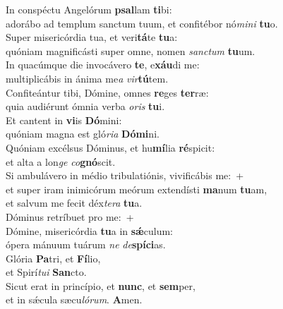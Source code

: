 \evenverse In conspéctu Angelórum \textbf{psal}lam \textbf{ti}bi:~\*\\
\evenverse adorábo ad templum sanctum tuum, et confitébor nó\textit{mi}\textit{ni} \textbf{tu}o.\\
\oddverse Super misericórdia tua, et veri\textbf{tá}te \textbf{tu}a:~\*\\
\oddverse quóniam magnificásti super omne, nomen \textit{san}\textit{ctum} \textbf{tu}um.\\
\evenverse In quacúmque die invocávero \textbf{te}, e\textbf{xáu}di me:~\*\\
\evenverse multiplicábis in ánima me\textit{a} \textit{vir}\textbf{tú}tem.\\
\oddverse Confiteántur tibi, Dómine, omnes \textbf{re}ges \textbf{ter}ræ:~\*\\
\oddverse quia audiérunt ómnia verba \textit{o}\textit{ris} \textbf{tu}i.\\
\evenverse Et cantent in \textbf{vi}is \textbf{Dó}mini:~\*\\
\evenverse quóniam magna est gló\textit{ri}\textit{a} \textbf{Dó}\textbf{mi}ni.\\
\oddverse Quóniam excélsus Dóminus, et hu\textbf{mí}lia \textbf{ré}spicit:~\*\\
\oddverse et alta a lon\textit{ge} \textit{co}\textbf{gnó}scit.\\
\evenverse Si ambulávero in médio tribulatiónis, vivificábis me:~+\\
\evenverse  et super iram inimicórum meórum extendísti \textbf{ma}num \textbf{tu}am,~\*\\
\evenverse et salvum me fecit déx\textit{te}\textit{ra} \textbf{tu}a.\\
\oddverse Dóminus retríbuet pro me:~+\\
\oddverse  Dómine, misericórdia \textbf{tu}a in \textbf{sǽ}culum:~\*\\
\oddverse ópera mánuum tuárum \textit{ne} \textit{de}\textbf{spí}\textbf{ci}as.\\
\evenverse Glória \textbf{Pa}tri, et \textbf{Fí}lio,~\*\\
\evenverse et Spirí\textit{tu}\textit{i} \textbf{San}cto.\\
\oddverse Sicut erat in princípio, et \textbf{nunc}, et \textbf{sem}per,~\*\\
\oddverse et in sǽcula sæcu\textit{ló}\textit{rum}. \textbf{A}men.\\

